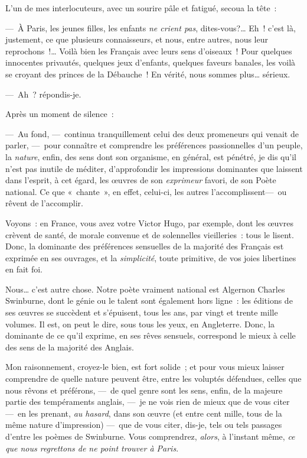\documentclass[french,twoside]{book} %
\begin{document}
L’un de mes interlocuteurs, avec un sourire pâle et fatigué, secoua la tête :\par
— À Paris, les jeunes filles, les enfants \emph{ne crient pas}, dites-vous?… Eh ! c’est là, justement, ce que plusieurs connaisseurs, et nous, entre autres, nous leur reprochons !… Voilà bien les Français avec leurs sens d’oiseaux ! Pour quelques innocentes privautés, quelques jeux d’enfants, quelques faveurs banales, les voilà se croyant des princes de la Débauche ! En vérité, nous sommes plus… sérieux.\par
— Ah ? répondis-je.\par
Après un moment de silence :\par
— Au fond, — continua tranquillement celui des deux promeneurs qui venait de parler, — pour connaître et comprendre les préférences passionnelles d’un peuple, la \emph{nature}, enfin, des sens dont son organisme, en général, est pénétré, je dis qu’il n’est pas inutile de méditer, d’approfondir les impressions dominantes que   laissent dans l’esprit, à cet égard, les œuvres de son \emph{exprimeur} favori, de son Poète national. Ce que « chante », en effet, celui-ci, les autres l’accomplissent— ou rêvent de l’accomplir.\par
Voyons : en France, vous avez votre Victor Hugo, par exemple, dont les œuvres crèvent de santé, de morale convenue et de solennelles vieilleries : tous le lisent. Donc, la dominante des préférences sensuelles de la majorité des Français est exprimée en ses ouvrages, et la \emph{simplicité}, toute primitive, de vos joies libertines en fait foi.\par
Nous… c’est autre chose. Notre poète vraiment national est Algernon Charles Swinburne, dont le génie ou le talent sont également hors ligne : les éditions de ses œuvres se succèdent et s’épuisent, tous les ans, par vingt et trente mille volumes. Il est, on peut le dire, sous tous les yeux, en Angleterre. Donc, la dominante de ce qu’il exprime, en ses rêves sensuels, correspond le mieux à celle des sens de la majorité des Anglais.\par
Mon raisonnement, croyez-le bien, est fort   solide ; et pour vous mieux laisser comprendre de quelle nature peuvent être, entre les voluptés défendues, celles que nous rêvons et préférons, — de quel genre sont les sens, enfin, de la majeure partie des tempéraments anglais, — je ne vois rien de mieux que de vous citer— en les prenant, \emph{au hasard}, dans son œuvre (et entre cent mille, tous de la même nature d’impression) — que de vous citer, dis-je, tels ou tels passages d’entre les poèmes de Swinburne. Vous comprendrez, \emph{alors}, à l’instant même, \emph{ce que nous regrettons de ne point trouver à Paris}.\par
\end{document}
